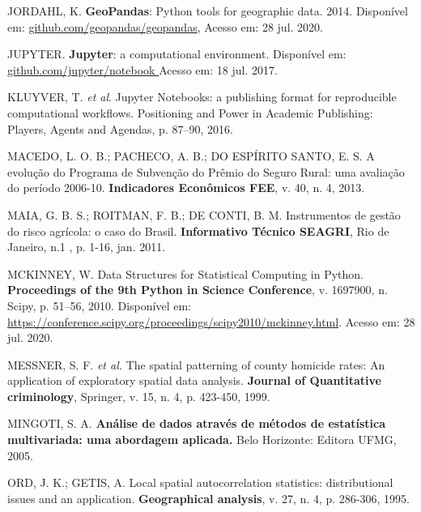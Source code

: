 \documentclass[
	12pt,				%
	openright,			%
	oneside,			%
	a4paper,			%
	chapter=TITLE,		%
	section=TITLE,		%
	english,			%
	french,				%
	spanish,			%
	brazil				%
	]{abntex2}
\begin{document}
\begin{thebibliography}{}
    {JORDAHL, K. \textbf{GeoPandas}: Python tools for geographic data. 2014. Disponível em: \url{github.com/geopandas/geopandas}, Acesso em: 28 jul. 2020.}
    
    {JUPYTER. \textbf{Jupyter}: a computational environment. Disponível em: \url{github.com/jupyter/notebook } Acesso em: 18 jul. 2017.} 
    
    {KLUYVER, T. \textit{et al}. Jupyter Notebooks: a publishing format for reproducible computational workflows. Positioning and Power in Academic Publishing: Players, Agents and Agendas, p. 87–90, 2016.}
    
    {MACEDO, L. O. B.; PACHECO, A. B.; DO ESPÍRITO SANTO, E. S. A evolução do Programa de Subvenção do Prêmio do Seguro Rural: uma avaliação do período 2006-10. \textbf{Indicadores Econômicos FEE}, v. 40, n. 4, 2013.}
    
    {MAIA, G. B. S.; ROITMAN, F. B.; DE CONTI, B. M. Instrumentos de gestão do risco agrícola: o caso do Brasil. \textbf{Informativo Técnico SEAGRI}, Rio de Janeiro, n.1 , p. 1-16, jan. 2011.}
    
    {MCKINNEY, W. Data Structures for Statistical Computing in Python. \textbf{Proceedings of the 9th Python in Science Conference}, v. 1697900, n. Scipy, p. 51–56, 2010. Disponível em: \url{https://conference.scipy.org/proceedings/scipy2010/mckinney.html}. Acesso em: 28 jul. 2020.}
    
    {MESSNER, S. F. \textit{et al.}  The spatial patterning of county homicide rates: An application of exploratory spatial data analysis. \textbf{Journal of Quantitative criminology}, Springer, v. 15, n. 4, p. 423-450, 1999.}
    
    {MINGOTI, S. A. \textbf{Análise de dados através de métodos de estatística multivariada: uma abordagem aplicada.} Belo Horizonte: Editora UFMG, 2005.}
    
    {ORD, J. K.; GETIS, A. Local spatial autocorrelation statistics: distributional issues and an application. \textbf{Geographical analysis}, v. 27, n. 4, p. 286-306, 1995.}
    

\end{thebibliography}
\end{document}
